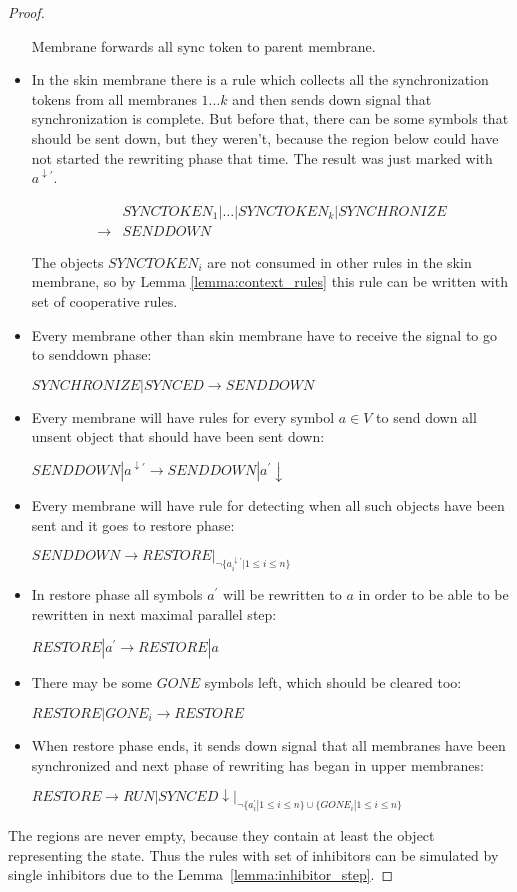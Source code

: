 \begin{proof}
\begin{itemize}
    Membrane forwards all sync token to parent membrane.

    \item In the skin membrane there is a rule which collects all the synchronization tokens from all membranes $1\dots k$ and then sends down signal that synchronization is complete. But before that, there can be some symbols that should be sent down, but they weren't, because the region below could have not started the rewriting phase that time. The result was just marked with $a^{\downarrow\prime}$.

    \begin{align*}
      &SYNCTOKEN_1|\dots|SYNCTOKEN_k|SYNCHRONIZE \\
      \rightarrow &SENDDOWN
    \end{align*}

    The objects $SYNCTOKEN_i$ are not consumed in other rules in the skin membrane, so by Lemma \ref{lemma:context_rules} this rule can be written with set of cooperative rules.

    \item Every membrane other than skin membrane have to receive the signal to go to senddown phase:

    $SYNCHRONIZE|SYNCED \rightarrow SENDDOWN$

    \item Every membrane will have rules for every symbol $a\in V$ to send down all unsent object that should have been sent down:

    $SENDDOWN|a^{\downarrow\prime} \rightarrow SENDDOWN|a^{\prime}\downarrow$

    \item Every membrane will have rule for detecting when all such objects have been sent and it goes to restore phase:

    $SENDDOWN \rightarrow RESTORE|_{\neg \{a_i^{\downarrow\prime}|1\leq i\leq n\}}$

    \item In restore phase all symbols $a^{\prime}$ will be rewritten to $a$ in order to be able to be rewritten in next maximal parallel step:

    $RESTORE|a^{\prime} \rightarrow RESTORE|a$

    \item There may be some $GONE$ symbols left, which should be cleared too:

    $RESTORE|GONE_i \rightarrow RESTORE$

    \item When restore phase ends, it sends down signal that all membranes have been synchronized and next phase of rewriting has began in upper membranes:

    $RESTORE \rightarrow RUN|SYNCED\downarrow|_{\neg \{a_i^{\prime}|1\leq i\leq n\}\cup\{GONE_i|1\leq i\leq n\}}$
  \end{itemize}


  The regions are never empty, because they contain at least the object representing the state. Thus the rules with set of inhibitors can be simulated by single inhibitors due to the Lemma~\ref{lemma:inhibitor_step}.
\end{proof}

